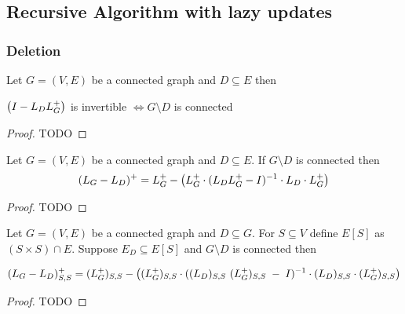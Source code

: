 




\subsection{Recursive Algorithm with lazy updates}




\subsubsection{Deletion}

\begin{HXl}
  Let $G=(V,E)$ be a connected graph and $D \subseteq E$ then  
  
  $\left( I - L_D L_{G}^{+} \right)$ is invertible $\iff G \setminus D$ is connected 
  
\end{HXl}

\begin{proof}
 TODO
\end{proof}




\begin{HXt} 
 Let $G=(V,E)$ be a connected graph and $D \subseteq E$. If $G \setminus D$ is connected then 
$$ (L_G - L_D)^+ = L_{G}^{+} - \left( L_{G}^{+} \cdot (L_DL_{G}^{+}-I)^{-1} \cdot L_D \cdot L_{G}^{+}\right)$$
\end{HXt}

\begin{proof}
 TODO
\end{proof}

\begin{HXd}[Submatrix]
 
\end{HXd}


\begin{HXc}
  Let $G=(V,E)$ be a connected graph and $D \subseteq G$. For $S \subseteq V$ define $ E[S] $ as $(S \times S) \cap E$. Suppose $E_D \subseteq E[S]$ and  $G \setminus D$ is connected then 
  
  $$ (L_G - L_D)_{S,S}^+ = (L_{G}^{+})_{S,S} - \left( (L_{G}^{+})_{S,S} \cdot ((L_D)_{S,S} \  (L_{G}^{+})_{S,S} \; - \; I)^{-1} \cdot (L_D)_{S,S} \cdot (L_{G}^{+})_{S,S} \right) $$ 
  
\end{HXc}
\begin{proof}
 TODO
\end{proof}

